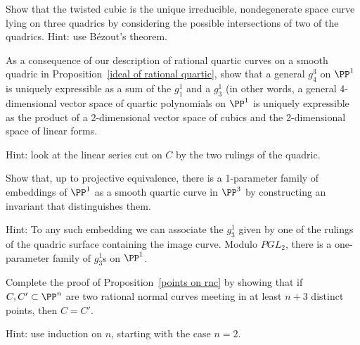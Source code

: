 \begin{exercise}
Show that the twisted cubic is the unique irreducible, nondegenerate space curve lying on three quadrics by considering the possible
intersections of two of the quadrics. Hint: use B\'ezout's theorem.
\end{exercise}

\begin{exercise}\label{decomposition of a $g^3_4$}
As a consequence of our description of rational quartic curves on a smooth quadric in Proposition~\ref{ideal of rational quartic},
show that a general $g^3_4$ on $\PP^1$ is uniquely expressible as a sum of the $g_1^1$ and a $g^1_3$
(in other words, a general 4-dimensional vector space of quartic polynomials on $\PP^1$ is uniquely expressible as the product of a 2-dimensional vector space of cubics and the 2-dimensional space of linear forms.

Hint: look at the linear series cut on $C$ by the two rulings of the quadric.
\end{exercise}

\begin{exercise}\label{distinguishing rational quartics}
Show that, up to projective equivalence, there is a 1-parameter family of embeddings of $\PP^1$ as a 
smooth quartic curve in $\PP^3$ 
by constructing an invariant that distinguishes them. 

Hint: To any such embedding we can associate the $g^1_3$ given by one of the rulings of the quadric surface containing the image curve. Modulo $PGL_2$, there is a one-parameter family of $g^1_3$s on $\PP^1$. 
\end{exercise}

\begin{exercise}\label{Castelnuovo uniqueness}
Complete the proof of Proposition~\ref{points on rnc} by showing that if $C, C' \subset \PP^n$ are two rational normal curves meeting in at least $n+3$ distinct points, then $C = C'$. 

Hint: use induction on $n$, starting with the case $n=2$.
\end{exercise}


